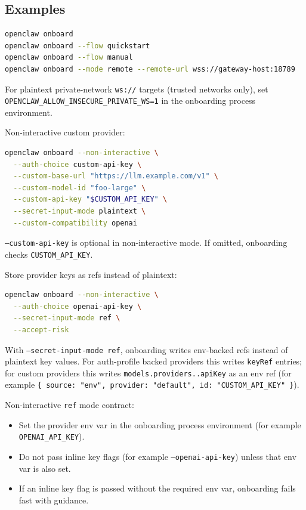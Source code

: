 \subsection{Examples}


\begin{lstlisting}[language=bash]
openclaw onboard
openclaw onboard --flow quickstart
openclaw onboard --flow manual
openclaw onboard --mode remote --remote-url wss://gateway-host:18789
\end{lstlisting}


For plaintext private-network \texttt{ws://} targets (trusted networks only), set
\texttt{OPENCLAW\_ALLOW\_INSECURE\_PRIVATE\_WS=1} in the onboarding process environment.

Non-interactive custom provider:

\begin{lstlisting}[language=bash]
openclaw onboard --non-interactive \
  --auth-choice custom-api-key \
  --custom-base-url "https://llm.example.com/v1" \
  --custom-model-id "foo-large" \
  --custom-api-key "$CUSTOM_API_KEY" \
  --secret-input-mode plaintext \
  --custom-compatibility openai
\end{lstlisting}


\texttt{--custom-api-key} is optional in non-interactive mode. If omitted, onboarding checks \texttt{CUSTOM\_API\_KEY}.

Store provider keys as refs instead of plaintext:

\begin{lstlisting}[language=bash]
openclaw onboard --non-interactive \
  --auth-choice openai-api-key \
  --secret-input-mode ref \
  --accept-risk
\end{lstlisting}


With \texttt{--secret-input-mode ref}, onboarding writes env-backed refs instead of plaintext key values.
For auth-profile backed providers this writes \texttt{keyRef} entries; for custom providers this writes \texttt{models.providers..apiKey} as an env ref (for example \texttt{\{ source: "env", provider: "default", id: "CUSTOM\_API\_KEY" \}}).

Non-interactive \texttt{ref} mode contract:

\begin{itemize}
  \item Set the provider env var in the onboarding process environment (for example \texttt{OPENAI\_API\_KEY}).
  \item Do not pass inline key flags (for example \texttt{--openai-api-key}) unless that env var is also set.
  \item If an inline key flag is passed without the required env var, onboarding fails fast with guidance.
\end{itemize}


